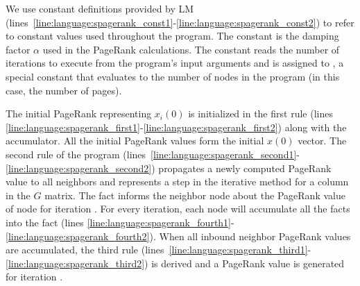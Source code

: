 We use constant definitions provided by LM
(lines~\ref{line:language:spagerank_const1}-\ref{line:language:spagerank_const2})
to refer to constant values used throughout the program. The 
constant is the damping factor $\alpha$ used in the PageRank calculations. The
constant  reads the number of iterations to execute from the
program's input arguments and  is assigned to , a
special constant that evaluates to the number of nodes in the program (in this
case, the number of pages).

The initial PageRank representing $x_i(0)$ is initialized in the first rule
(lines
\ref{line:language:spagerank_first1}-\ref{line:language:spagerank_first2}) along
with the accumulator. All the initial PageRank values form the initial $x(0)$
vector. The second rule of the program
(lines~\ref{line:language:spagerank_second1}-\ref{line:language:spagerank_second2})
propagates a newly computed PageRank value to all neighbors and represents a
step in the iterative method for a column in the $G$ matrix. The fact
 informs the neighbor node about the PageRank value of
node  for iteration . For every iteration, each node will
accumulate all the  facts into the
 fact (lines
\ref{line:language:spagerank_fourth1}-\ref{line:language:spagerank_fourth2}).
When all inbound neighbor PageRank values are accumulated, the third rule
(lines~\ref{line:language:spagerank_third1}-\ref{line:language:spagerank_third2})
is derived and a PageRank value is generated for iteration .

